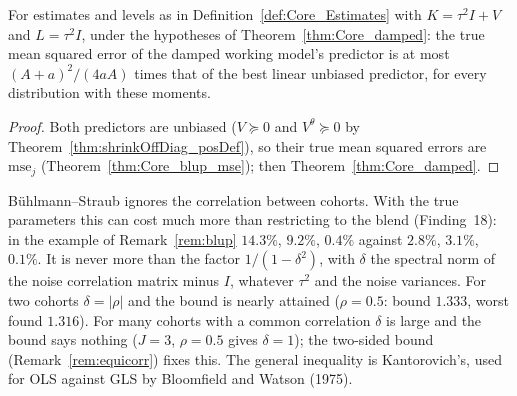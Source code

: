 \begin{theorem}\label{thm:Core_damped_mse}
  \leanok
  For estimates and levels as in Definition~\ref{def:Core_Estimates} with $K = \tau^2I + V$
  and $L = \tau^2I$, under the hypotheses of Theorem~\ref{thm:Core_damped}: the true mean
  squared error of the damped working model's predictor is at most $(A+a)^2/(4aA)$ times
  that of the best linear unbiased predictor, for every distribution with these moments.
\end{theorem}
\begin{proof}
  \leanok
  Both predictors are unbiased ($V \succeq 0$ and $V^\theta \succeq 0$ by
  Theorem~\ref{thm:shrinkOffDiag_posDef}), so their true mean squared errors are
  $\mathrm{mse}_j$ (Theorem~\ref{thm:Core_blup_mse}); then Theorem~\ref{thm:Core_damped}.
\end{proof}

\begin{remark}\label{rem:ignoreCorr}
  Bühlmann--Straub ignores the correlation between cohorts. With the true parameters this
  can cost much more than restricting to the blend (Finding~18): in the example of
  Remark~\ref{rem:blup} $14.3\%$, $9.2\%$, $0.4\%$ against $2.8\%$, $3.1\%$, $0.1\%$.
  It is never more than the factor $1/(1-\delta^2)$, with $\delta$ the spectral norm of
  the noise correlation matrix minus $I$, whatever $\tau^2$ and the noise variances.
  For two cohorts $\delta = |\rho|$ and the bound is nearly attained ($\rho = 0.5$: bound
  $1.333$, worst found $1.316$). For many cohorts with a common correlation $\delta$ is
  large and the bound says nothing ($J = 3$, $\rho = 0.5$ gives $\delta = 1$); the two-sided
  bound (Remark~\ref{rem:equicorr}) fixes this. The general
  inequality is Kantorovich's, used for OLS against GLS by Bloomfield and Watson (1975).
\end{remark}

